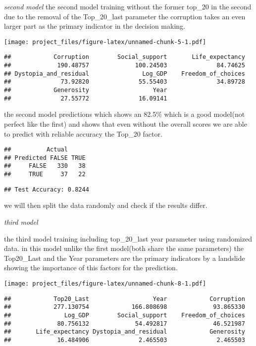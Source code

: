 \documentclass[
]{article}
\begin{document}
\emph{second model} the second model training without the former top\_20
in the second due to the removal of the Top\_20\_last parameter the
corruption takes an even larger part as the primary indicator in the
decision making.

\texttt{[image: project\_files/figure-latex/unnamed-chunk-5-1.pdf]}

\begin{verbatim}
##            Corruption        Social_support       Life_expectancy 
##             190.48757             100.24503              84.74625 
## Dystopia_and_residual               Log_GDP    Freedom_of_choices 
##              73.92820              55.55403              34.89728 
##            Generosity                  Year 
##              27.55772              16.09141
\end{verbatim}

the second model predictions which shows an 82.5\% which is a good
model(not perfect like the first) and shows that even without the
overall scores we are able to predict with reliable accuracy the Top\_20
factor.

\begin{verbatim}
##          Actual
## Predicted FALSE TRUE
##     FALSE   330   38
##     TRUE     37   22
\end{verbatim}

\begin{verbatim}
## Test Accuracy: 0.8244
\end{verbatim}

we will then split the data randomly and check if the results differ.

\emph{third model}

the third model training including top\_20\_last year parameter using
randomized data. in this model unlike the first model(both share the
same parameters) the Top20\_Last and the Year parameters are the primary
indicators by a landslide showing the importance of this factors for the
prediction.

\texttt{[image: project\_files/figure-latex/unnamed-chunk-8-1.pdf]}

\begin{verbatim}
##            Top20_Last                  Year            Corruption 
##            277.130754            166.808698             93.865330 
##               Log_GDP        Social_support    Freedom_of_choices 
##             80.756132             54.492817             46.521987 
##       Life_expectancy Dystopia_and_residual            Generosity 
##             16.484906              2.465503              2.465503
\end{verbatim}
\end{document}
